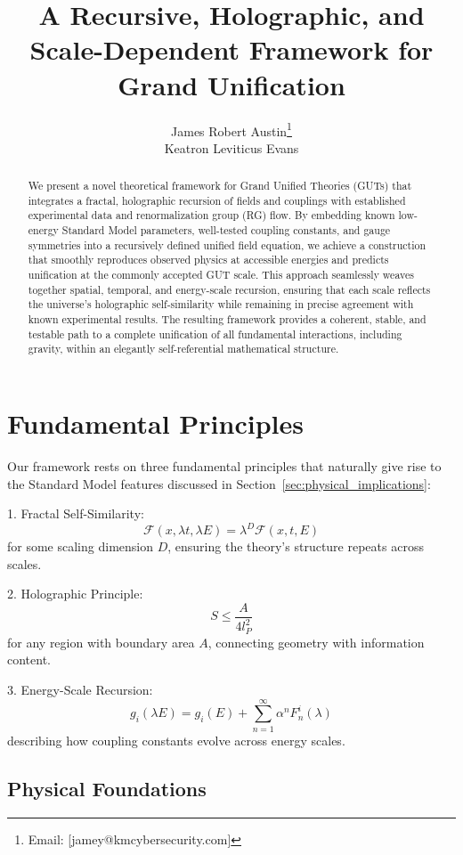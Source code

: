 \documentclass{article}
\title{A Recursive, Holographic, and Scale-Dependent Framework for Grand Unification}
\author{James Robert Austin\footnote{Email: [jamey@kmcybersecurity.com]} \\ Keatron Leviticus Evans}
\begin{document}
\maketitle

\begin{abstract}
We present a novel theoretical framework for Grand Unified Theories (GUTs) that integrates a fractal, holographic recursion of fields and couplings with established experimental data and renormalization group (RG) flow. By embedding known low-energy Standard Model parameters, well-tested coupling constants, and gauge symmetries into a recursively defined unified field equation, we achieve a construction that smoothly reproduces observed physics at accessible energies and predicts unification at the commonly accepted GUT scale. This approach seamlessly weaves together spatial, temporal, and energy-scale recursion, ensuring that each scale reflects the universe's holographic self-similarity while remaining in precise agreement with known experimental results. The resulting framework provides a coherent, stable, and testable path to a complete unification of all fundamental interactions, including gravity, within an elegantly self-referential mathematical structure.
\end{abstract}

\section{Fundamental Principles}

Our framework rests on three fundamental principles that naturally give rise to the Standard Model features discussed in Section~\ref{sec:physical_implications}:

1. Fractal Self-Similarity:
   \[
   \mathcal{F}(x, \lambda t, \lambda E) = \lambda^D \mathcal{F}(x, t, E)
   \]
   for some scaling dimension $D$, ensuring the theory's structure repeats across scales.

2. Holographic Principle:
   \[
   S \leq \frac{A}{4l_P^2}
   \]
   for any region with boundary area $A$, connecting geometry with information content.

3. Energy-Scale Recursion:
   \[
   g_i(\lambda E) = g_i(E) + \sum_{n=1}^{\infty} \alpha^n F_n^i(\lambda)
   \]
   describing how coupling constants evolve across energy scales.

\subsection{Physical Foundations}
\end{document}
